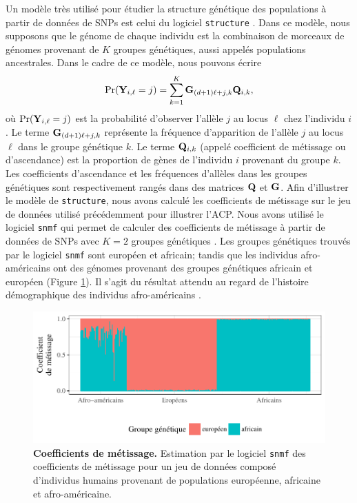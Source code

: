 \documentclass[12pt,a4paper,twoside]{ugathesis}
\begin{document}
Un modèle très utilisé pour étudier la structure génétique des populations à
partir de données de SNPs est celui du logiciel \texttt{structure} \citep{Pritchard2000}.
Dans ce modèle, nous supposons que le génome de chaque individu est la
combinaison de morceaux de génomes provenant de \(K\) groupes génétiques, aussi
appelés populations ancestrales. Dans le cadre de ce modèle, nous pouvons écrire
\begin{equation}
\label{eq:structure}
\Pr(\mathbf{Y}_{i,\ell} = j) = \sum_{k = 1}^{K} \mathbf{G}_{(d + 1)\ell + j, k} \mathbf{Q}_{i,k},
\end{equation}
où \(\Pr(\mathbf{Y}_{i,\ell} = j)\) est la probabilité d'observer l'allèle \(j\) au locus
\(\ell\) chez l'individu \(i\). Le terme \(\mathbf{G}_{(d + 1)\ell + j, k}\) représente
la fréquence d'apparition de l'allèle \(j\) au locus \(\ell\) dans le groupe
génétique \(k\). Le terme \(\mathbf{Q}_{i,k}\) (appelé coefficient de métissage ou
d'ascendance) est la proportion de gènes de l'individu \(i\) provenant du groupe
\(k\). Les coefficients d'ascendance et les fréquences d'allèles dans les groupes
génétiques sont respectivement rangés dans des matrices \(\mathbf{Q}\) et \(\mathbf{G}\). Afin
d'illustrer le modèle de \texttt{structure}, nous avons calculé les coefficients de
métissage sur le jeu de données utilisé précédemment pour illustrer l'ACP. Nous
avons utilisé le logiciel \texttt{snmf} qui permet de calculer des coefficients de
métissage à partir de données de SNPs avec \(K = 2\) groupes génétiques
\citep{Frichot_2015}. Les groupes génétiques trouvés par le logiciel \texttt{snmf} sont
européen et africain; tandis que les individus afro-américains ont des génomes
provenant des groupes génétiques africain et européen (Figure
\ref{fig:tess3_intro}). Il s'agit du résultat attendu au regard de l'histoire
démographique des individus afro-américains \citep{tishkoff2009genetic}.

\begin{figure}[h]
\centering
\includegraphics{./OUTPUT/Rplots/tess3_intro_barplot.pdf}
\caption{{\bf Coefficients de métissage.} Estimation par le logiciel
  \texttt{snmf} des coefficients de métissage pour un jeu de données composé
  d'individus humains provenant de populations européenne, africaine et
  afro-américaine.}
\label{fig:tess3_intro}
\end{figure}
\end{document}
